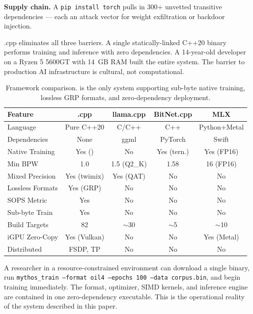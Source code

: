 \textbf{Supply chain.} A \texttt{pip install torch} pulls in 300+ unvetted
transitive dependencies --- each an attack vector for weight exfiltration or
backdoor injection.

\MYTHOS{}.cpp eliminates all three barriers. A single statically-linked C++20
binary performs training and inference with zero dependencies. A 14-year-old
developer on a Ryzen 5 5600GT with 14~GB RAM built the entire system. The
barrier to production AI infrastructure is cultural, not computational.

\begin{table}[htbp]
\centering
\caption{Framework comparison. \OIL{} is the only system supporting sub-byte
native training, lossless GRP formats, and zero-dependency deployment.}
\label{tab:framework_comparison}
\begin{tabular}{lcccc}
\toprule
\textbf{Feature} & \textbf{\MYTHOS{}.cpp} & \textbf{llama.cpp} &
\textbf{BitNet.cpp} & \textbf{MLX} \\
\midrule
Language         & Pure C++20    & C/C++        & C++         & Python+Metal \\
Dependencies     & None          & ggml         & PyTorch     & Swift        \\
Native Training  & Yes (\OIL{})  & No           & Yes (tern.) & Yes (FP16)   \\
Min BPW          & 1.0           & 1.5 (Q2\_K)  & 1.58        & 16 (FP16)    \\
Mixed Precision  & Yes (twimix)  & Yes (QAT)    & No          & No           \\
Lossless Formats & Yes (GRP)     & No           & No          & No           \\
SOPS Metric      & Yes           & No           & No          & No           \\
Sub-byte Train   & Yes           & No           & No          & No           \\
Build Targets    & 82            & $\sim$30     & $\sim$5     & $\sim$10     \\
iGPU Zero-Copy   & Yes (Vulkan)  & No           & No          & Yes (Metal)  \\
Distributed      & FSDP, TP      & No           & No          & No           \\
\bottomrule
\end{tabular}
\end{table}

A researcher in a resource-constrained environment can download a single
binary, run \texttt{mythos\_train --format oil4 --epochs 100
--data corpus.bin}, and begin training immediately. The format, optimizer,
SIMD kernels, and inference engine are contained in one zero-dependency
executable. This is the operational reality of the system described in
this paper.


